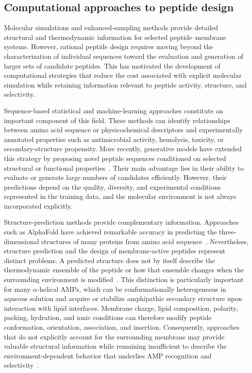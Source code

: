 \subsection{Computational approaches to peptide design}

Molecular simulations and enhanced-sampling methods provide detailed structural and thermodynamic information for selected peptide--membrane systems. However, rational peptide design requires moving beyond the characterization of individual sequences toward the evaluation and generation of larger sets of candidate peptides. This has motivated the development of computational strategies that reduce the cost associated with explicit molecular simulation while retaining information relevant to peptide activity, structure, and selectivity.

Sequence-based statistical and machine-learning approaches constitute an important component of this field. These methods can identify relationships between amino acid sequence or physicochemical descriptors and experimentally annotated properties such as antimicrobial activity, hemolysis, toxicity, or secondary-structure propensity. More recently, generative models have extended this strategy by proposing novel peptide sequences conditioned on selected structural or functional properties~\cite{cecilia_1,charron2025navigating}. Their main advantage lies in their ability to evaluate or generate large numbers of candidates efficiently. However, their predictions depend on the quality, diversity, and experimental conditions represented in the training data, and the molecular environment is not always incorporated explicitly.

Structure-prediction methods provide complementary information. Approaches such as AlphaFold have achieved remarkable accuracy in predicting the three-dimensional structures of many proteins from amino acid sequence~\cite{Jumper2021,Yang2023}. Nevertheless, structure prediction and the design of membrane-active peptides represent distinct problems. A predicted structure does not by itself describe the thermodynamic ensemble of the peptide or how that ensemble changes when the surrounding environment is modified~\cite{Bowman2024}. This distinction is particularly important for many $\alpha$-helical AMPs, which can be conformationally heterogeneous in aqueous solution and acquire or stabilize amphipathic secondary structure upon interaction with lipid interfaces. Membrane charge, lipid composition, polarity, packing, hydration, and ionic conditions can therefore modify peptide conformation, orientation, association, and insertion. Consequently, approaches that do not explicitly account for the surrounding membrane may provide valuable structural information while remaining insufficient to describe the environment-dependent behavior that underlies AMP recognition and selectivity~\cite{Yang2023,articulo_limitacion_ia}.

